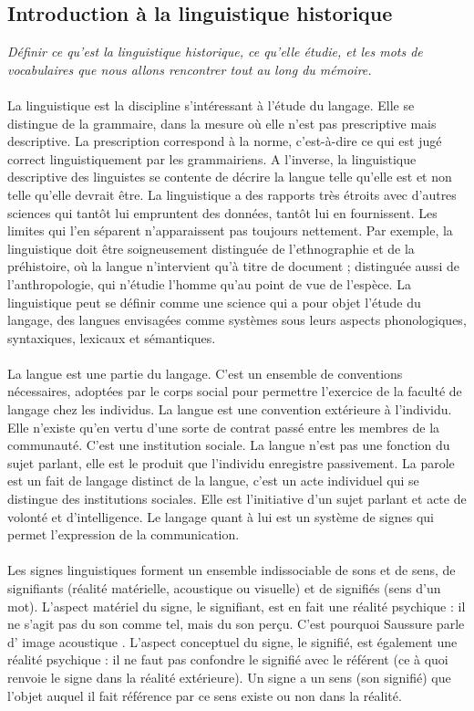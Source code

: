 \documentclass[12pt, french, twoside]{report}
\begin{document}
\subsection{Introduction à la linguistique historique}
\textit{Définir ce qu'est la linguistique historique, ce qu'elle étudie, et les mots de vocabulaires que nous allons rencontrer tout au long du mémoire.}\\ \\
\indent La linguistique est la discipline s'intéressant à l'étude du langage. Elle se distingue de la grammaire, dans la mesure où elle n'est pas prescriptive mais descriptive. La prescription correspond à la norme, c'est-à-dire ce qui est jugé correct linguistiquement par les grammairiens. A l'inverse, la linguistique descriptive des linguistes se contente de décrire la langue telle qu'elle est et non telle qu'elle devrait être. La linguistique a des rapports très étroits avec d'autres sciences qui tantôt lui empruntent des données, tantôt lui en fournissent. Les limites qui l'en séparent n'apparaissent pas toujours nettement. Par exemple, la linguistique doit être soigneusement distinguée de l'ethnographie et de la préhistoire, où la langue n'intervient qu'à titre de document ; distinguée aussi de l'anthropologie, qui n'étudie l'homme qu'au point de vue de l'espèce. La linguistique peut se définir comme une science qui a pour objet l'étude du langage, des langues envisagées comme systèmes sous leurs aspects phonologiques, syntaxiques, lexicaux et sémantiques. 
\\ \\
\indent La langue est une partie du langage. C'est un ensemble de conventions nécessaires, adoptées par le corps social pour permettre l'exercice de la faculté de langage chez les individus. La langue est une convention extérieure à l'individu. Elle n'existe qu'en vertu d'une sorte de contrat passé entre les membres de la communauté. C'est une institution sociale. La langue n'est pas une fonction du sujet parlant, elle est le produit que l'individu enregistre passivement. La parole est un fait de langage distinct de la langue, c'est un acte individuel qui se distingue des institutions sociales. Elle est l'initiative d'un sujet parlant et acte de volonté et d'intelligence. Le langage quant à lui est un système de signes qui permet l'expression de la communication. 
\\ \\ 
\indent Les signes linguistiques forment un ensemble indissociable de sons et de sens, de signifiants (réalité matérielle, acoustique ou visuelle) et de signifiés (sens d'un mot). L'aspect \og matériel \fg du signe, le signifiant, est en fait une réalité psychique : il ne s'agit pas du son comme tel, mais du son perçu. C'est pourquoi Saussure parle d' \og image acoustique \fg. L'aspect \og conceptuel \fg du signe, le signifié, est également une réalité psychique : il ne faut pas  confondre le signifié avec le référent (ce à quoi renvoie le signe dans la réalité extérieure). Un signe a un sens (son signifié) que l'objet auquel il fait référence par ce sens existe ou non dans  la réalité. 
\end{document}
